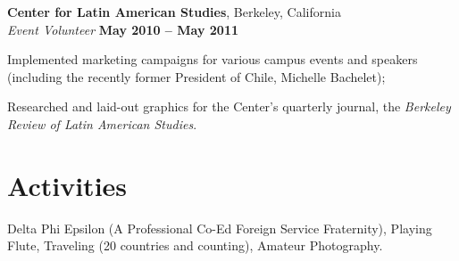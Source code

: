 \documentclass[margin,line]{resume}
\begin{document}
\begin{resume}
	
	\textbf{Center for Latin American Studies}, Berkeley, California \vspace{1mm}\\\vspace{0mm}%
	\textsl{Event Volunteer} \hfill \textbf{May 2010 -- May 2011}\vspace{0mm}\vspace{0mm}%
	\begin{list2}
		\item Implemented marketing campaigns for various campus events and speakers (including the recently former President
	of Chile, Michelle Bachelet); 
		\item Researched and laid-out graphics for the Center's quarterly journal, the \emph{Berkeley Review of
	Latin American Studies}. 
	\end{list2}

	\section{\mysidestyle Activities}

	Delta Phi Epsilon (A Professional Co-Ed Foreign Service Fraternity), Playing Flute,
	Traveling (20 countries and counting), Amateur Photography.


\end{resume}
\end{document}
